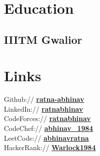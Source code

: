 \documentclass[]{deedy-resume-openfont}
\begin{document}
%
%
\lastupdated

%
%

%
%

\begin{minipage}[t]{0.33\textwidth} 


\section{Education \\}
\subsection{IIITM Gwalior}
\sectionsep



\section{Links} 
Github:// \href{https://github.com/ratna-abhinav}{\bf ratna-abhinav} \\
LinkedIn://  \href{https://www.linkedin.com/in/abhinav-ratna-858346202}{\bf ratnabhinav} \\
CodeForces://  \href{https://codeforces.com/profile/ratna_abhinav}{\bf ratnabhinav} \\
CodeChef://  \href{https://www.codechef.com/users/abhinav1984}{\bf abhinav\_1984} \\
LeetCode://  \href{https://leetcode.com/imt_2020002/}{\bf abhinavratna} \\
HackerRank:// \href{https://www.hackerrank.com/Warlock1984?hr_r=1}{\bf Warlock1984}\\



\end{minipage}
\end{document}
